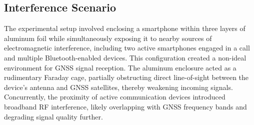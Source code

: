 
    \subsection{Interference Scenario}
    
        The experimental setup involved enclosing a smartphone within three layers of aluminum foil while simultaneously exposing it to nearby sources of electromagnetic interference, including two active smartphones engaged in a call and multiple Bluetooth-enabled devices. 
        This configuration created a non-ideal environment for GNSS signal reception. %
        The aluminum enclosure acted as a rudimentary Faraday cage, partially obstructing direct line-of-sight between the device's antenna and GNSS satellites, thereby weakening incoming signals. 
        Concurrently, the proximity of active communication devices introduced broadband RF interference, likely overlapping with GNSS frequency bands and degrading signal quality further.
